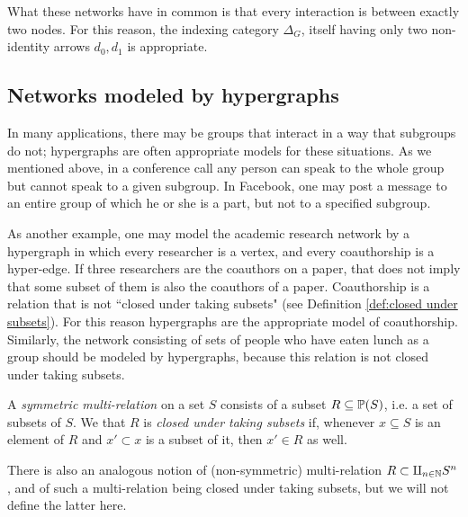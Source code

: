\documentclass{amsart}
\begin{document}
What these networks have in common is that every interaction is between exactly two nodes.  For this reason, the indexing category $\Delta_G$, itself having only two non-identity arrows $d_0,d_1$ is appropriate.

\subsection{Networks modeled by hypergraphs}

In many applications, there may be groups that interact in a way that subgroups do not; hypergraphs are often appropriate models for these situations.  As we mentioned above, in a conference call any person can speak to the whole group but cannot speak to a given subgroup.  In Facebook, one may post a message to an entire group of which he or she is a part, but not to a specified subgroup.  

As another example, one may model the academic research network by a hypergraph in which every researcher is a vertex, and every coauthorship is a hyper-edge.  If three researchers are the coauthors on a paper, that does not imply that some subset of them is also the coauthors of a paper.  Coauthorship is a relation that is not ``closed under taking subsets" (see Definition \ref{def:closed under subsets}).  For this reason hypergraphs are the appropriate model of coauthorship.  Similarly, the network consisting of sets of people who have eaten lunch as a group should be modeled by hypergraphs, because this relation is not closed under taking subsets.

\begin{definition}\label{def:closed under subsets}

A {\em symmetric multi-relation} on a set $S$ consists of a subset $R\subseteq{\mathbb P}(S)$, i.e. a set of subsets of $S$.  We that $R$ is {\em closed under taking subsets} if, whenever $x\subseteq S$ is an element of $R$ and $x'\subset x$ is a subset of it, then $x'\in R$ as well.

\end{definition}  

\begin{remark} 

There is also an analogous notion of (non-symmetric) multi-relation $R\subset\amalg_{n\in{\mathbb N}}S^n$, and of such a multi-relation being closed under taking subsets, but we will not define the latter here.

\end{remark}
\end{document}
